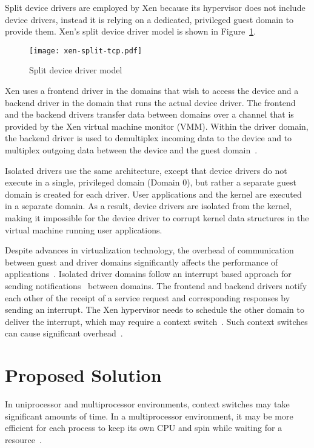 Split device drivers are employed by Xen because its hypervisor
does not include device drivers,
instead it is relying on a dedicated, privileged guest domain to provide them.
Xen's split device driver model is shown in Figure~\ref{fig:xen-split}.
\begin{figure}[!ht]
\centering
\texttt{[image: xen-split-tcp.pdf]}
\caption{Split device driver model}
\label{fig:xen-split}
\end{figure}
Xen uses a frontend driver in the domains that wish to access the device
and a backend driver in the domain that runs the actual device driver. The
frontend and the backend drivers transfer data between domains over
a channel that is provided by the Xen virtual machine monitor (VMM).
Within the driver domain, the backend driver is used to demultiplex
incoming data to the device and to multiplex outgoing data between the
device and the guest domain~\cite{driverdomain}.

Isolated drivers use the same architecture, except that device drivers
do not execute in a single, privileged domain (Domain 0), but rather
a separate guest domain is created for each driver.
User applications and the kernel are executed in a separate domain.
As a result, device drivers are isolated from the 
kernel, making it impossible for the device driver to corrupt kernel
data structures in the virtual machine running user applications.

Despite advances in virtualization technology, the overhead of
communication between guest and driver domains significantly
affects the performance of applications~\cite{barham2003xen,
Sugerman:2001:VID:647055.715774, Menon:2006:ONV:1267359.1267361}. Isolated
driver domains follow an interrupt based approach for sending
notifications~\cite{barham2003xen} between domains. The frontend and backend 
drivers notify each other of the receipt of a service request and corresponding responses
by sending an interrupt. The Xen hypervisor needs to schedule the
other domain to deliver the interrupt, which may require a context
switch~\cite{barham2003xen}. Such context switches can cause significant
overhead~\cite{Li:2007:QCC:1281700.1281702, Mogul:1991:ECS:106973.106982}.

\section {Proposed Solution}
\label{sec:solution}
In uniprocessor and multiprocessor environments, context switches may take
significant amounts of time. In a multiprocessor environment, it may be more
efficient for each process to keep its own CPU and spin while waiting
for a resource~\cite{Bovet:2005:ULK:1077084}. 

